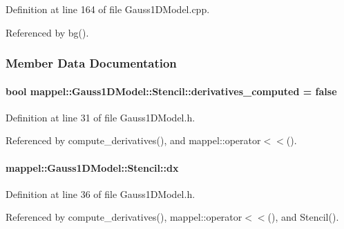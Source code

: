 Definition at line 164 of file Gauss1\+D\+Model.\+cpp.



Referenced by bg().



\subsubsection{Member Data Documentation}
\paragraph[{\texorpdfstring{derivatives\+\_\+computed}{derivatives_computed}}]{\setlength{\rightskip}{0pt plus 5cm}bool mappel\+::\+Gauss1\+D\+Model\+::\+Stencil\+::derivatives\+\_\+computed = false}\hypertarget{classmappel_1_1Gauss1DModel_1_1Stencil_a799e21dea3f00371748444f2ea80dba3}{}\label{classmappel_1_1Gauss1DModel_1_1Stencil_a799e21dea3f00371748444f2ea80dba3}


Definition at line 31 of file Gauss1\+D\+Model.\+h.



Referenced by compute\+\_\+derivatives(), and mappel\+::operator$<$$<$().

\paragraph[{\texorpdfstring{dx}{dx}}]{ mappel\+::\+Gauss1\+D\+Model\+::\+Stencil\+::dx}\hypertarget{classmappel_1_1Gauss1DModel_1_1Stencil_afb0de9218a5def7bf8a68eb29bfba910}{}\label{classmappel_1_1Gauss1DModel_1_1Stencil_afb0de9218a5def7bf8a68eb29bfba910}


Definition at line 36 of file Gauss1\+D\+Model.\+h.



Referenced by compute\+\_\+derivatives(), mappel\+::operator$<$$<$(), and Stencil().

